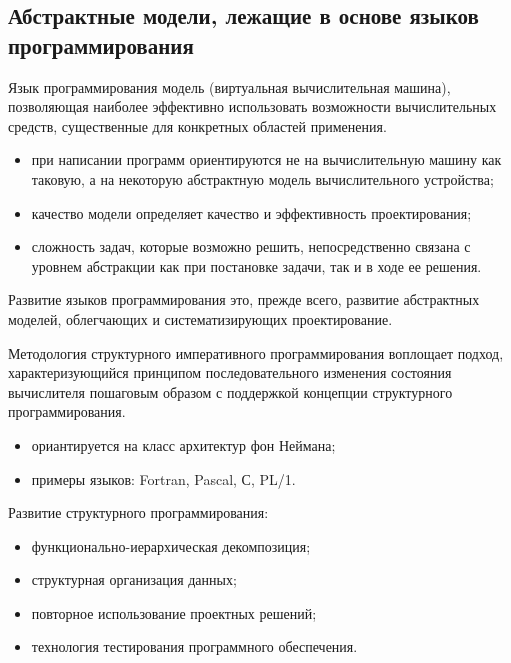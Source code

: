 \documentclass{beamer}
\begin{document}
\subsection{Абстрактные модели, лежащие в основе языков программирования}
\begin{frame}
\begin{block}{Язык программирования}
модель (виртуальная вычислительная машина), позволяющая наиболее эффективно использовать возможности вычислительных средств, существенные для конкретных областей применения. 
\end{block}
\begin{itemize}
\item при написании программ ориентируются не на вычислительную машину как таковую, а на некоторую абстрактную модель вычислительного устройства;
\item качество модели определяет качество
и эффективность проектирования;
\item сложность задач, которые возможно решить, непосредственно связана с уровнем абстракции как при постановке задачи, так и в ходе ее решения.
\end{itemize}
\begin{block}{Развитие языков программирования}
это, прежде всего, развитие абстрактных моделей, облегчающих и систематизирующих проектирование.
\end{block}
\end{frame}

\begin{frame}
\begin{block}{Методология структурного императивного программирования}
воплощает подход, характеризующийся принципом последовательного изменения состояния вычислителя пошаговым образом с поддержкой концепции структурного программирования. 
\end{block}
\begin{itemize}
\item ориантируется на класс архитектур фон Неймана;
\item примеры языков: Fortran, Pascal, С, PL/1.
\end{itemize}
Развитие структурного программирования:
\begin{itemize}
\item функционально-иерархическая декомпозиция;
\item структурная организация данных;
\item повторное использование проектных решений;
\item технология тестирования программного обеспечения.
\end{itemize}
\end{frame}
\end{document}
